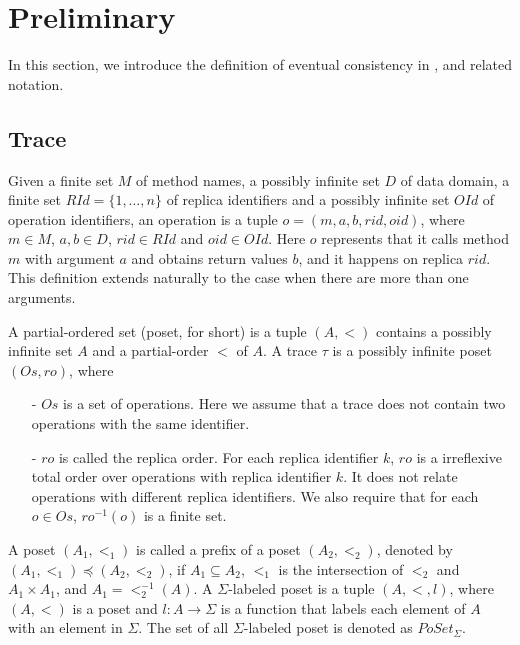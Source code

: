 
\section{Preliminary}
\label{sec:preliminary}

In this section, we introduce the definition of eventual consistency in \cite{Bouajjani:2014}, and related notation.


\subsection{Trace}
\label{subsec:trace}

Given a finite set $M$ of method names, a possibly infinite set $D$ of data domain, a finite set $RId=\{1,\ldots,n\}$ of replica identifiers and a possibly infinite set $OId$ of operation identifiers, an operation is a tuple $o=(m,a,b,rid,oid)$, where $m \in M$, $a,b \in D$, $rid \in RId$ and $oid \in OId$. Here $o$ represents that it calls method $m$ with argument $a$ and obtains return values $b$, and it happens on replica $rid$. This definition extends naturally to the case when there are more than one arguments.

A partial-ordered set (poset, for short) is a tuple $(A,<)$ contains a possibly infinite set $A$ and a partial-order $<$ of $A$. A trace $\tau$ is a possibly infinite poset $(Os,ro)$, where
\begin{itemize}
\setlength{\itemsep}{0.5pt}
\item[-] $Os$ is a set of operations. Here we assume that a trace does not contain two operations with the same identifier.

\item[-] $ro$ is called the replica order. For each replica identifier $k$, $ro$ is a irreflexive total order over operations with replica identifier $k$. It does not relate operations with different replica identifiers. We also require that for each $o \in Os$, $ro^{-1}(o)$ is a finite set.
\end{itemize}

A poset $(A_1,<_1)$ is called a prefix of a poset $(A_2,<_2)$, denoted by $(A_1,<_1) \preceq (A_2,<_2)$, if $A_1 \subseteq A_2$, $<_1$ is the intersection of $<_2$ and $A_1 \times A_1$, and $A_1 = <_2^{-1}(A)$. A $\Sigma$-labeled poset is a tuple $(A,<,l)$, where $(A,<)$ is a poset and $l:A \rightarrow \Sigma$ is a function that labels each element of $A$ with an element in $\Sigma$. The set of all $\Sigma$-labeled poset is denoted as $PoSet_{\Sigma}$.


